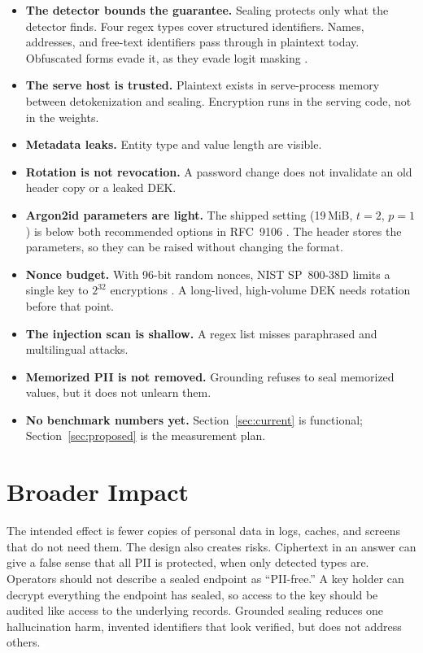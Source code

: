 \documentclass[11pt]{article}
\begin{document}
\begin{itemize}
  \item \textbf{The detector bounds the guarantee.} Sealing protects only what the detector finds. Four regex types cover structured identifiers. Names, addresses, and free-text identifiers pass through in plaintext today. Obfuscated forms evade it, as they evade logit masking \citep{ram2025constrained}.
  \item \textbf{The serve host is trusted.} Plaintext exists in serve-process memory between detokenization and sealing. Encryption runs in the serving code, not in the weights.
  \item \textbf{Metadata leaks.} Entity type and value length are visible.
  \item \textbf{Rotation is not revocation.} A password change does not invalidate an old header copy or a leaked DEK.
  \item \textbf{Argon2id parameters are light.} The shipped setting (19\,MiB, $t = 2$, $p = 1$) is below both recommended options in RFC~9106 \citep{rfc9106}. The header stores the parameters, so they can be raised without changing the format.
  \item \textbf{Nonce budget.} With 96-bit random nonces, NIST SP~800-38D limits a single key to $2^{32}$ encryptions \citep{nist80038d}. A long-lived, high-volume DEK needs rotation before that point.
  \item \textbf{The injection scan is shallow.} A regex list misses paraphrased and multilingual attacks.
  \item \textbf{Memorized PII is not removed.} Grounding refuses to seal memorized values, but it does not unlearn them.
  \item \textbf{No benchmark numbers yet.} Section~\ref{sec:current} is functional; Section~\ref{sec:proposed} is the measurement plan.
\end{itemize}

\section{Broader Impact}
\label{sec:impact}

The intended effect is fewer copies of personal data in logs, caches, and screens that do not need them. The design also creates risks. Ciphertext in an answer can give a false sense that all PII is protected, when only detected types are. Operators should not describe a sealed endpoint as ``PII-free.'' A key holder can decrypt everything the endpoint has sealed, so access to the key should be audited like access to the underlying records. Grounded sealing reduces one hallucination harm, invented identifiers that look verified, but does not address others.
\end{document}
